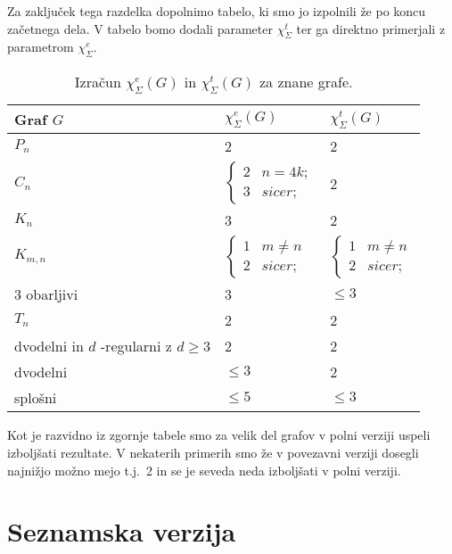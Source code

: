 \documentclass[12pt,a4paper,twoside]{article}
\theoremstyle{definition} %
\theoremstyle{plain} %
\newcommand{\ec}{\chi_{\Sigma}^e}
\newcommand{\ect}{\chi_{\Sigma}^t}
\numberwithin{equation}{section}  %
\begin{document}
Za zaključek tega razdelka dopolnimo tabelo, ki smo jo izpolnili že po koncu začetnega dela. V tabelo bomo dodali parameter $\ect$ ter ga direktno primerjali z parametrom $\ec$.
\begin{table}[H]
\caption{\label{tab:tab2} Izračun $\ec(G)$ in $\ect(G)$ za znane grafe. }
\centering
\begin{tabular}{|l|l|l|}
\hline
 Graf $G$ & $\ec(G)$ & $\ect(G) $ \\ \hline
 $P_n$ & 2 & 2 \\ \hline
 $C_n$ & $\begin{cases}
	2 & n = 4k;\\ 
	3 & sicer;
	\end{cases}$ & 2 \\ \hline
 $K_n$& 3 & 2 \\ \hline
 $K_{m,n}$& $\begin{cases}
	1 & m \neq n\\ 
	2 & sicer;
	\end{cases}$ &$\begin{cases}
	1 & m \neq n\\ 
	2 & sicer;
	\end{cases}$ \\ \hline
 3 obarljivi& 3 & $\le 3$ \\ \hline
$T_n$ & 2 & 2\\ \hline
dvodelni in $d$ -regularni z $d \ge 3 $ & 2  & 2\\ \hline
dvodelni   & $\le 3$  & 2\\ \hline
splošni   & $\le 5$  &$ \le 3$\\ \hline
\end{tabular}
\end{table}
Kot je razvidno iz zgornje tabele smo za velik del grafov v polni verziji uspeli izboljšati rezultate. V nekaterih primerih smo že v povezavni verziji dosegli najnižjo možno mejo t.j.\ 2 in se je seveda neda izboljšati v polni verziji.


\section{Seznamska verzija} 
\end{document}
